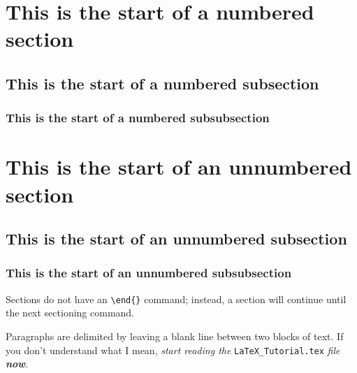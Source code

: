 \documentclass[letterpaper]{article}
\begin{document}

\section{This is the start of a numbered section}
\label{Label for a numbered section start}

\subsection{This is the start of a numbered subsection}
\label{Label for a numbered subsection start}

\subsubsection{This is the start of a numbered subsubsection}
\label{Label for a numbered subsubsection start}

\section*{This is the start of an unnumbered section}
\label{Label for an unnumbered section start}

\subsection*{This is the start of an unnumbered subsection}
\label{Label for an unnumbered subsection start}

\subsubsection*{This is the start of an unnumbered subsubsection}
\label{Label for an unnumbered subsubsection start}

Sections do not have an \verb+\end{}+ command; instead, a section will
continue until the next sectioning command.

Paragraphs are delimited by leaving a blank line between two blocks of 
text.  If you don't understand what I mean, \emph{start reading the} 
\texttt{LaTeX\_Tutorial.tex} \emph{file \textbf{now}}.
\end{document}
